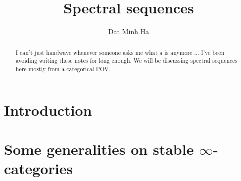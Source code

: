 

\setcounter{section}{-1}





    \title{Spectral sequences}
    
    \author{Dat Minh Ha}
    \maketitle
    
    \begin{abstract}
        I can't just handwave whenever someone asks me what a  is anymore ... I've been avoiding writing these notes for long enough. We will be discussing spectral sequences here mostly from a categorical POV.
    \end{abstract}
    
    {
      \hypersetup{} 
      \tableofcontents %
    }

    \section{Introduction}

    \section{Some generalities on stable \texorpdfstring{$\infty$}{}-categories}
